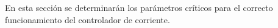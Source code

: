 En esta sección se determinarán los parámetros críticos para el correcto funcionamiento del controlador de corriente.



%
% 
%
%
%
